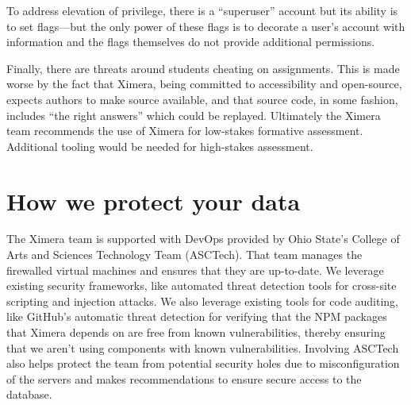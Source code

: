 \documentclass{ximera}
\begin{document}
To address elevation of privilege, there is a ``superuser'' account
but its ability is to set flags---but the only power of these flags is
to decorate a user's account with information and the flags themselves
do not provide additional permissions.

Finally, there are threats around students cheating on assignments.
This is made worse by the fact that Ximera, being committed to
accessibility and open-source, expects authors to make source
available, and that source code, in some fashion, includes ``the right
answers'' which could be replayed.  Ultimately the Ximera team
recommends the use of Ximera for low-stakes formative assessment.
Additional tooling would be needed for high-stakes assessment.

\section{How we protect your data}

The Ximera team is supported with DevOps provided by Ohio State's
College of Arts and Sciences Technology Team (ASCTech).  That team
manages the firewalled virtual machines and ensures that they are
up-to-date.  We leverage existing security frameworks, like automated
threat detection tools for cross-site scripting and injection attacks.
We also leverage existing tools for code auditing, like GitHub's
automatic threat detection for verifying that the NPM packages that
Ximera depends on are free from known vulnerabilities, thereby
ensuring that we aren't using components with known vulnerabilities.
Involving ASCTech also helps protect the team from potential security
holes due to misconfiguration of the servers and makes recommendations
to ensure secure access to the database.
\end{document}
